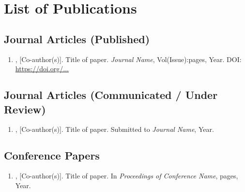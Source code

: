 
\chapter*{List of Publications}
\thispagestyle{plain}

\section*{Journal Articles (Published)}

\begin{enumerate}
  \item \AuthorName, [Co-author(s)]. Title of paper. \textit{Journal Name},
    Vol(Issue):pages, Year. DOI: \url{https://doi.org/...}
\end{enumerate}

\section*{Journal Articles (Communicated / Under Review)}

\begin{enumerate}
  \item \AuthorName, [Co-author(s)]. Title of paper. Submitted to
    \textit{Journal Name}, Year.
\end{enumerate}

\section*{Conference Papers}

\begin{enumerate}
  \item \AuthorName, [Co-author(s)]. Title of paper. In \textit{Proceedings of
    Conference Name}, pages, Year.
\end{enumerate}
